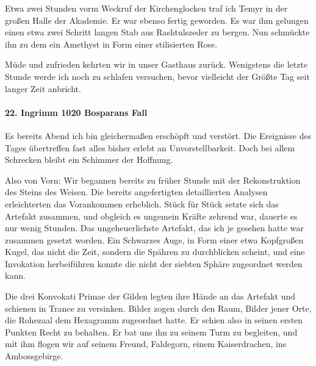 Etwa zwei Stunden vorm Weckruf der Kirchenglocken traf ich Temyr in der großen Halle der Akademie. Er war ebenso fertig geworden. Es war ihm gelungen einen etwa zwei Schritt langen Stab aus Rashtulszeder zu bergen. Nun schmückte ihn zu dem ein Amethyst in Form einer stilisierten Rose.

Müde und zufrieden kehrten wir in unser Gasthaus zurück. Wenigstens die letzte Stunde werde ich noch zu schlafen versuchen, bevor vielleicht der Größte Tag seit langer Zeit anbricht.

\paragraph{22. Ingrimm 1020 Bosparans Fall}
Es bereits Abend ich bin gleichermaßen erschöpft und verstört. Die Ereignisse des Tages übertreffen fast alles bisher erlebt an Unvorstellbarkeit. Doch bei allem Schrecken bleibt ein Schimmer der Hoffnung.

Also von Vorn: Wir begannen bereits zu früher Stunde mit der Rekonstruktion des Steins des Weisen. Die bereits angefertigten detaillierten Analysen erleichterten das Vorankommen erheblich. Stück für Stück setzte sich das Artefakt zusammen, und obgleich es ungemein Kräfte zehrend war, dauerte es nur wenig Stunden. Das ungeheuerlichste Artefakt, das ich je gesehen hatte war zusammen gesetzt worden. Ein Schwarzes Auge, in Form einer etwa Kopfgroßen Kugel, das nicht die Zeit, sondern die Spähren zu durchblicken scheint, und eine Invokation herbeiführen konnte die nicht der siebten Sphäre zugeordnet werden kann.

Die drei Konvokati Primae der Gilden legten ihre Hände an das Artefakt und schienen in Trance zu versinken. Bilder zogen durch den Raum, Bilder jener Orte, die Rohezaal dem Hexagramm zugeordnet hatte. Er schien also in seinen ersten Punkten Recht zu behalten. Er bat uns ihn zu seinem Turm zu begleiten, und mit ihm flogen wir auf seinem Freund, Faldegorn, einem Kaiserdrachen, ins Ambossgebirge.

